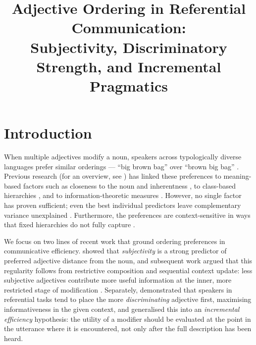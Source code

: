 \documentclass[man,floatsintext]{apa7}
\title{Adjective Ordering in Referential Communication:\\
Subjectivity, Discriminatory Strength, and Incremental Pragmatics}
\begin{document}
\maketitle

\section{Introduction}
\label{sec:intro}

When multiple adjectives modify a noun, speakers across typologically diverse languages prefer similar orderings --- ``big brown bag'' over ``brown big bag'' \citep{scontras2023adjective,sproat1991}.
Previous research (for an overview, see \citealp{scontras2023adjective}) has linked these preferences to meaning-based factors such as closeness to the noun and inherentness \citep{sweet1898,whorf1945grammatical,martin1969a}, to class-based hierarchies \citep{quirk1972,dixon1982,cinque1994,scott2002}, and to information-theoretic measures \citep{Hahn_information_2018,futrell-etal-2020-determines,dyer2023evaluating}.
However, no single factor has proven sufficient; even the best individual predictors leave complementary variance unexplained \citep{dyer2023evaluating}.
Furthermore, the preferences are context-sensitive in ways that fixed hierarchies do not fully capture \citep{trotzke2019,fukumura2018ordering}.

We focus on two lines of recent work that ground ordering preferences in communicative efficiency.
\citet{scontras2017subjectivity} showed that \emph{subjectivity} is a strong predictor of preferred adjective distance from the noun, and subsequent work argued that this regularity follows from restrictive composition and sequential context update: less subjective adjectives contribute more useful information at the inner, more restricted stage of modification \citep{franke2019subjectivity,scontras2019grammatical,scontras2020incremental}.
Separately, \citet{fukumura2018ordering} demonstrated that speakers in referential tasks tend to place the more \emph{discriminating} adjective first, maximising informativeness in the given context, and \citet{rubio2021wordorder} generalised this into an \emph{incremental efficiency} hypothesis: the utility of a modifier should be evaluated at the point in the utterance where it is encountered, not only after the full description has been heard.
\end{document}
